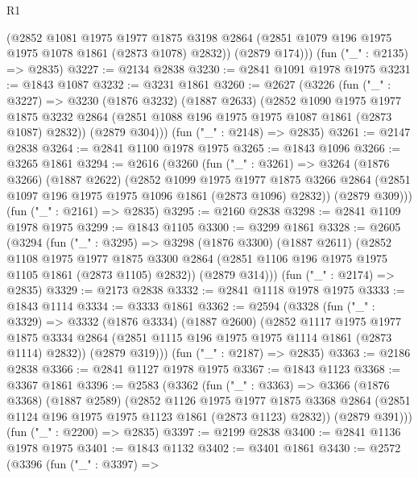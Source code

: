 \begin{lexlean}{R1}
\begin{coremodule}
        (@2852
          @1081
          @1975
          @1977
          @1875
          @3198
          @2864
          (@2851 @1079 @196 @1975 @1975 @1078 @1861 (@2873 @1078) @2832))
        (@2879 @174)))
    (fun ("_" : @2135) => @2835)
@3227 := @2134 @2838
@3230 := @2841 @1091 @1978 @1975
@3231 := @1843 @1087
@3232 := @3231 @1861
@3260 := @2627
    (@3226
      (fun ("_" : @3227) =>
      @3230
        (@1876 @3232)
        (@1887 @2633)
        (@2852
          @1090
          @1975
          @1977
          @1875
          @3232
          @2864
          (@2851 @1088 @196 @1975 @1975 @1087 @1861 (@2873 @1087) @2832))
        (@2879 @304)))
    (fun ("_" : @2148) => @2835)
@3261 := @2147 @2838
@3264 := @2841 @1100 @1978 @1975
@3265 := @1843 @1096
@3266 := @3265 @1861
@3294 := @2616
    (@3260
      (fun ("_" : @3261) =>
      @3264
        (@1876 @3266)
        (@1887 @2622)
        (@2852
          @1099
          @1975
          @1977
          @1875
          @3266
          @2864
          (@2851 @1097 @196 @1975 @1975 @1096 @1861 (@2873 @1096) @2832))
        (@2879 @309)))
    (fun ("_" : @2161) => @2835)
@3295 := @2160 @2838
@3298 := @2841 @1109 @1978 @1975
@3299 := @1843 @1105
@3300 := @3299 @1861
@3328 := @2605
    (@3294
      (fun ("_" : @3295) =>
      @3298
        (@1876 @3300)
        (@1887 @2611)
        (@2852
          @1108
          @1975
          @1977
          @1875
          @3300
          @2864
          (@2851 @1106 @196 @1975 @1975 @1105 @1861 (@2873 @1105) @2832))
        (@2879 @314)))
    (fun ("_" : @2174) => @2835)
@3329 := @2173 @2838
@3332 := @2841 @1118 @1978 @1975
@3333 := @1843 @1114
@3334 := @3333 @1861
@3362 := @2594
    (@3328
      (fun ("_" : @3329) =>
      @3332
        (@1876 @3334)
        (@1887 @2600)
        (@2852
          @1117
          @1975
          @1977
          @1875
          @3334
          @2864
          (@2851 @1115 @196 @1975 @1975 @1114 @1861 (@2873 @1114) @2832))
        (@2879 @319)))
    (fun ("_" : @2187) => @2835)
@3363 := @2186 @2838
@3366 := @2841 @1127 @1978 @1975
@3367 := @1843 @1123
@3368 := @3367 @1861
@3396 := @2583
    (@3362
      (fun ("_" : @3363) =>
      @3366
        (@1876 @3368)
        (@1887 @2589)
        (@2852
          @1126
          @1975
          @1977
          @1875
          @3368
          @2864
          (@2851 @1124 @196 @1975 @1975 @1123 @1861 (@2873 @1123) @2832))
        (@2879 @391)))
    (fun ("_" : @2200) => @2835)
@3397 := @2199 @2838
@3400 := @2841 @1136 @1978 @1975
@3401 := @1843 @1132
@3402 := @3401 @1861
@3430 := @2572
    (@3396
      (fun ("_" : @3397) =>

\end{coremodule}
\end{lexlean}
